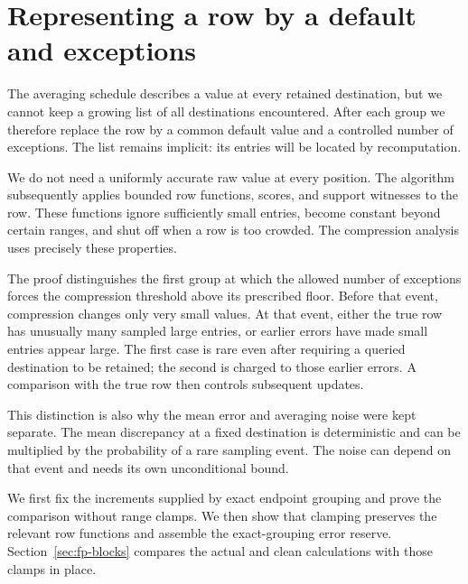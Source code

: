 \documentclass[11pt]{article}
\numberwithin{equation}{section}
\theoremstyle{definition}
\theoremstyle{remark}
\begin{document}
\section{Representing a row by a default and exceptions}
\label{sec:buf-compression}

The averaging schedule describes a value at every retained destination, but we cannot keep a growing list of all destinations encountered. After each group we therefore replace the row by a common default value and a controlled number of exceptions. The list remains implicit: its entries will be located by recomputation.

We do not need a uniformly accurate raw value at every position. The algorithm subsequently applies bounded row functions, scores, and support witnesses to the row. These functions ignore sufficiently small entries, become constant beyond certain ranges, and shut off when a row is too crowded. The compression analysis uses precisely these properties.

The proof distinguishes the first group at which the allowed number of exceptions forces the compression threshold above its prescribed floor. Before that event, compression changes only very small values. At that event, either the true row has unusually many sampled large entries, or earlier errors have made small entries appear large. The first case is rare even after requiring a queried destination to be retained; the second is charged to those earlier errors. A comparison with the true row then controls subsequent updates.

This distinction is also why the mean error and averaging noise were kept separate. The mean discrepancy at a fixed destination is deterministic and can be multiplied by the probability of a rare sampling event. The noise can depend on that event and needs its own unconditional bound.

We first fix the increments supplied by exact endpoint grouping and prove
the comparison without range clamps.  We then show that clamping preserves
the relevant row functions and assemble the exact-grouping error reserve.
Section~\ref{sec:fp-blocks} compares the actual and clean calculations with
those clamps in place.
\end{document}

